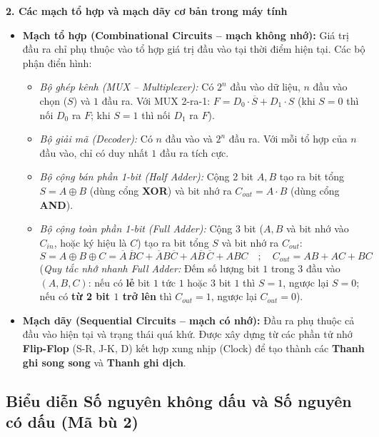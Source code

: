 \textbf{2. Các mạch tổ hợp và mạch dãy cơ bản trong máy tính}
\begin{itemize}
    \item \textbf{Mạch tổ hợp (Combinational Circuits -- mạch không nhớ):} Giá trị đầu ra chỉ phụ thuộc vào tổ hợp giá trị đầu vào tại thời điểm hiện tại. Các bộ phận điển hình:
    \begin{itemize}
        \item \textit{Bộ ghép kênh (MUX -- Multiplexer):} Có $2^n$ đầu vào dữ liệu, $n$ đầu vào chọn ($S$) và $1$ đầu ra. Với MUX 2-ra-1: $F = D_0 \cdot \overline{S} + D_1 \cdot S$ (khi $S = 0$ thì nối $D_0$ ra $F$; khi $S = 1$ thì nối $D_1$ ra $F$).
        \item \textit{Bộ giải mã (Decoder):} Có $n$ đầu vào và $2^n$ đầu ra. Với mỗi tổ hợp của $n$ đầu vào, chỉ có duy nhất $1$ đầu ra tích cực.
        \item \textit{Bộ cộng bán phần 1-bit (Half Adder):} Cộng 2 bit $A, B$ tạo ra bit tổng $S = A \oplus B$ (dùng cổng \textbf{XOR}) và bit nhớ ra $C_{out} = A \cdot B$ (dùng cổng \textbf{AND}).
        \item \textit{Bộ cộng toàn phần 1-bit (Full Adder):} Cộng 3 bit ($A, B$ và bit nhớ vào $C_{in}$, hoặc ký hiệu là $C$) tạo ra bit tổng $S$ và bit nhớ ra $C_{out}$:
        $$S = A \oplus B \oplus C = \overline{A}\,\overline{B}C + \overline{A}B\overline{C} + A\overline{B}\,\overline{C} + ABC \quad ; \quad C_{out} = AB + AC + BC$$
        (\textit{Quy tắc nhớ nhanh Full Adder:} Đếm số lượng bit $1$ trong 3 đầu vào $(A, B, C)$: nếu có \textbf{lẻ} bit $1$ tức $1$ hoặc $3$ bit $1$ thì $S = 1$, ngược lại $S = 0$; nếu có \textbf{từ 2 bit $1$ trở lên} thì $C_{out} = 1$, ngược lại $C_{out} = 0$).
    \end{itemize}
    \item \textbf{Mạch dãy (Sequential Circuits -- mạch có nhớ):} Đầu ra phụ thuộc cả đầu vào hiện tại và trạng thái quá khứ. Được xây dựng từ các phần tử nhớ \textbf{Flip-Flop} (S-R, J-K, D) kết hợp xung nhịp (Clock) để tạo thành các \textbf{Thanh ghi song song} và \textbf{Thanh ghi dịch}.
\end{itemize}

\subsection{Biểu diễn Số nguyên không dấu và Số nguyên có dấu (Mã bù 2)}

